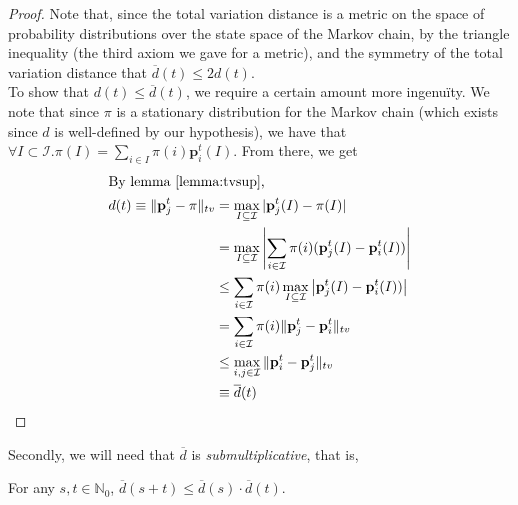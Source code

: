 		\begin{proof}
			Note that, since the total variation distance is a metric on the space
			of probability distributions over the  state space of the Markov chain,
			by the triangle inequality (the third axiom we gave for a metric), and 
			the symmetry of the total variation distance that $\overline d(t) \leq 
			2 d(t)$. \\
			To show that $d(t) \leq \overline d(t)$, we require a certain amount
			more ingenu\"ity. We note that since $\pi$ is a stationary distribution
			for the Markov chain (which exists since $d$ is well-defined by our 
			hypothesis), we have that $\forall I \subset \mathcal{I}. \pi(I) = 
			\sum_{i \in I} \pi(i) \mathbf{p}_i^t(I)$. From there, we get
			\begin{align*}
				\intertext{By lemma \ref{lemma:tvsup},}
				d(t) \equiv
				\|\mathbf{p}^t_j - \pi\|_{tv} &= \max_{I \subseteq \mathcal{I}}
				| \mathbf{p}^t_j(I) - \pi(I)| \\
				&= \max_{I \subseteq \mathcal{I}}\left|\sum_{i \in \mathcal{I}}
				\pi(i)(\mathbf{p}^t_j(I) - \mathbf{p}^t_i(I))\right| \\
				&\leq \sum_{i \in \mathcal{I}} \pi(i) \max_{I \subseteq 
				\mathcal{I}} 
				\left|\mathbf{p}^t_j(I) - \mathbf{p}^t_i(I))\right| \\
				&= \sum_{i \in \mathcal{I}} \pi(i) \|\mathbf{p}^t_j - 
				\mathbf{p}^t_i\|_{tv} \\
				&\leq \max_{i,j \in \mathcal{I}}
				\|\mathbf{p}^t_i - \mathbf{p}^t_j\|_{tv}\\
				&\equiv \overline d(t)
			\end{align*}
		\end{proof}
		Secondly, we will need that $\overline d$ is \emph{submultiplicative}, that is,
		\begin{lemma}
			\label{lemma:dsubmul}
			For any $s,t \in \mathbb{N}_0$, $\overline d(s + t) \leq \overline d(s)
			\cdot \overline d(t)$.
		\end{lemma}
